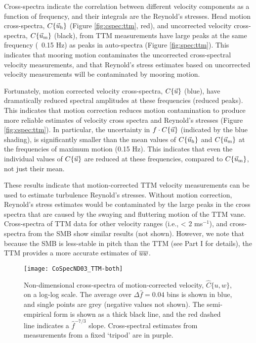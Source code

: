 Cross-spectra indicate the correlation between different velocity components as a function of frequency, and their integrals are the Reynold's stresses. Head motion cross-spectra, $C\{\vec{u}_\mathrm{h}\}$ (Figure \ref{fig:cspec:ttm}, red), and uncorrected velocity cross-spectra, $C\{\vec{u}_\mathrm{m}\}$ (black), from TTM measurements have large peaks at the same frequency (~0.15 Hz) as peaks in auto-spectra (Figure \ref{fig:spec:ttm}).  This indicates that mooring motion contaminates the uncorrected cross-spectral velocity measurements, and that Reynold's stress estimates based on uncorrected velocity measurements will be contaminated by mooring motion. 

Fortunately, motion corrected velocity cross-spectra, $C\{\vec{u}\}$ (blue), have dramatically reduced spectral amplitudes at these frequencies (reduced peaks). This indicates that motion correction reduces motion contamination to produce more reliable estimates of velocity cross spectra and Reynold's stresses (Figure \ref{fig:cspec:ttm}). In particular, the uncertainty in $f\cdot C\{\vec{u}\}$ (indicated by the blue shading), is significantly smaller than the mean values of $C\{\vec{u}_\mathrm{h}\}$ and $C\{\vec{u}_\mathrm{m}\}$ at the frequencies of maximum motion (0.15 Hz). This indicates that even the individual values of $C\{\vec{u}\}$ are reduced at these frequencies, compared to $C\{\vec{u}_\mathrm{m}\}$, not just their mean.

These results indicate that motion-corrected TTM velocity measurements can be used to estimate turbulence Reynold's stresses. Without motion correction, Reynold's stress estimates would be contaminated by the large peaks in the cross spectra that are caused by the swaying and fluttering motion of the TTM vane. Cross-spectra of TTM data for other velocity ranges (i.e., < 2 ms$^{-1}$), and cross-spectra from the SMB show similar results (not shown). However, we note that because the SMB is less-stable in pitch than the TTM (see Part I for details), the TTM provides a more accurate estimates of  $\overline{uw}$.

\begin{figure}[t]
  \centering
  \texttt{[image: CoSpecND03\_TTM-both]}
  \caption{Non-dimensional cross-spectra of motion-corrected velocity, $\hat{C}\{u,w\}$, on a log-log scale. The average over $\Delta \hat{f} = 0.04$ bins is shown in blue, and single points are grey (negative values not shown). The semi-empirical \cite{Kaimal++1972} form is shown as a thick black line, and the red dashed line indicates a $\hat{f}^{-7/3}$ slope. Cross-spectral estimates from measurements from a fixed `tripod' are in purple.}
  \label{fig:cspecnd:ttm}
\end{figure}

